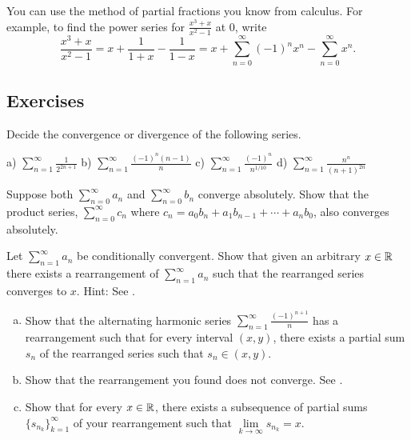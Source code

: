 You can use the method of partial fractions you know from calculus.
For example, to find the power series for $\frac{x^3+x}{x^2-1}$ at 0, write
\begin{equation*}
\frac{x^3+x}{x^2-1}
=
x + \frac{1}{1+x} - \frac{1}{1-x}
=
x + \sum_{n=0}^\infty {(-1)}^n x^n - \sum_{n=0}^\infty x^n .
\end{equation*}

\subsection{Exercises}

\begin{exercise}
Decide the convergence or divergence of the following series.

\medskip

\noindent
a)
$\displaystyle \sum_{n=1}^\infty \frac{1}{2^{2n+1}}$
\qquad
b)
$\displaystyle \sum_{n=1}^\infty \frac{{(-1)}^{n}(n-1)}{n}$
\qquad
c)
$\displaystyle \sum_{n=1}^\infty \frac{{(-1)}^n}{n^{1/10}}$
\qquad
d)
$\displaystyle \sum_{n=1}^\infty \frac{n^n}{{(n+1)}^{2n}}$
\end{exercise}

\begin{exercise}
Suppose both $\sum_{n=0}^\infty a_n$ and $\sum_{n=0}^\infty b_n$ 
converge absolutely.
Show that the product series, $\sum_{n=0}^\infty c_n$ where
$c_n = a_0 b_n + a_1 b_{n-1} + \cdots + a_n b_0$, also converges absolutely.
\end{exercise}

\begin{exercise}[Challenging] \label{exercise:seriesconvergestoanything}
Let $\sum_{n=1}^\infty a_n$ be conditionally convergent.
Show that given an arbitrary $x \in {\mathbb{R}}$
there exists a rearrangement of $\sum_{n=1}^\infty a_n$
such that the rearranged series converges to $x$.
Hint: See .
\end{exercise}

\begin{exercise}
\pagebreak[2]
\leavevmode
\begin{enumerate}[a)]
\item
Show that the alternating harmonic series $\sum_{n=1}^\infty \frac{{(-1)}^{n+1}}{n}$
has a rearrangement
such that for every interval $(x,y)$, there exists a partial sum $s_n$
of the rearranged series such that $s_n \in (x,y)$.
\item
Show that the rearrangement you found does not converge.
See .
\item
Show that for every $x \in {\mathbb{R}}$, there exists a subsequence of
partial sums $\{ s_{n_k} \}_{k=1}^\infty$ of your rearrangement such that 
$\lim\limits_{k\to\infty} s_{n_k} = x$.
\end{enumerate}
\end{exercise}

